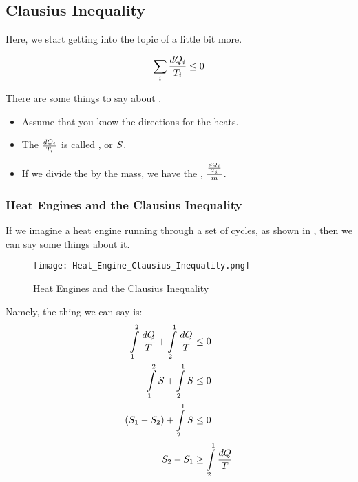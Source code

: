 \subsection{Clausius Inequality}\label{subsec:Clausius_Inequality}
Here, we start getting into the topic of  a little bit more.

\begin{equation}\label{eq:Clausius_Inequality}
  \sum\limits_{i} \frac{d Q_{i}}{T_{i}} \leq 0
\end{equation}

There are some things to say about .
\begin{itemize}[noitemsep]
\item Assume that you know the directions for the heats.
\item The $\frac{d Q_{i}}{T_{i}}$ is called , or $S$.
\item If we divide the  by the mass, we have the , $\frac{\frac{d Q_{i}}{T_{i}}}{m}$.
\end{itemize}

\subsubsection{Heat Engines and the Clausius Inequality}\label{subsubsec:Heat_Engine_Clausius_Inequality}
If we imagine a heat engine running through a set of cycles, as shown in , then we can say some things about it.

\begin{figure}[h!tbp]
  \centering
  \texttt{[image: Heat\_Engine\_Clausius\_Inequality.png]}
  \caption{Heat Engines and the Clausius Inequality}
  \label{fig:Heat_Engine_Clausius_Inequality}
\end{figure}

Namely, the thing we can say is:
\begin{align*}
  \int\limits_{1}^{2} \frac{d Q}{T} + \int\limits_{2}^{1} \frac{d Q}{T} &\leq 0 \\
  \int\limits_{1}^{2} S + \int\limits_{2}^{1} S &\leq 0 \\
  (S_{1} - S_{2}) + \int\limits_{2}^{1} S &\leq 0 \\
  S_{2} - S_{1} &\geq \int\limits_{2}^{1} \frac{d Q}{T}
\end{align*}

